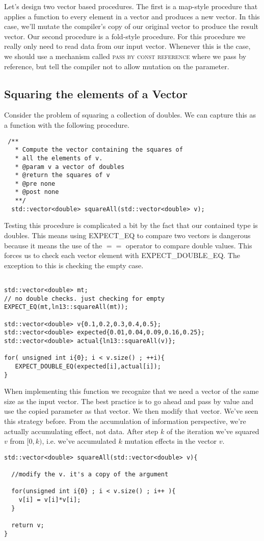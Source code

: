 \documentclass[]{tufte-handout}
\begin{document}
Let's design two vector based procedures. The first is a map-style procedure that applies a function to every element in a vector and produces a new vector.  In this case, we'll mutate the compiler's copy of our original vector to produce the result vector. Our second procedure is a fold-style procedure. For this procedure we really only need to read data from our input vector.  Whenever this is the case, we should use a mechanism called \textsc{pass by const reference} where we pass by reference, but tell the compiler not to allow mutation on the parameter.

\subsection{Squaring the elements of a Vector}

Consider the problem of squaring a collection of doubles.  We can capture this as a function with the following procedure. 
\begin{verbatim}
 /** 
   * Compute the vector containing the squares of 
   * all the elements of v.
   * @param v a vector of doubles
   * @return the squares of v 
   * @pre none
   * @post none
   **/
  std::vector<double> squareAll(std::vector<double> v);
\end{verbatim}

Testing this procedure is complicated a bit by the fact that our contained type is doubles. This means using EXPECT\_EQ to compare two vectors is dangerous because it means the use of the $==$ operator to compare double values. This forces us to check each vector element with EXPECT\_DOUBLE\_EQ.  The exception to this is checking the empty case.
\begin{verbatim}

std::vector<double> mt;
// no double checks. just checking for empty
EXPECT_EQ(mt,ln13::squareAll(mt));

std::vector<double> v{0.1,0.2,0.3,0.4,0.5};
std::vector<double> expected{0.01,0.04,0.09,0.16,0.25};
std::vector<double> actual{ln13::squareAll(v)};

for( unsigned int i{0}; i < v.size() ; ++i){
   EXPECT_DOUBLE_EQ(expected[i],actual[i]);
}
\end{verbatim}

When implementing this function we recognize that we need a vector of the same size as the input vector.  The best practice is to go ahead and pass by value and use the copied parameter as that vector. We then modify that vector.  We've seen this strategy before. From the accumulation of information perspective, we're actually accumulating effect, not data. After step $k$ of the iteration we've squared $v$ from $[0,k)$, i.e. we've accumulated $k$ mutation effects in the vector $v$. 
\begin{verbatim}
std::vector<double> squareAll(std::vector<double> v){
    
  //modify the v. it's a copy of the argument

  for(unsigned int i{0} ; i < v.size() ; i++ ){
    v[i] = v[i]*v[i];
  }

  return v;
}
\end{verbatim}
\end{document}
